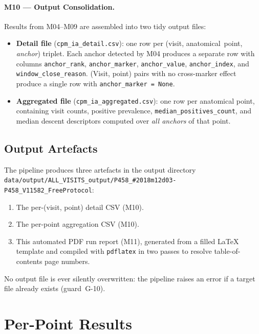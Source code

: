 \documentclass[a4paper,11pt]{article}
\begin{document}
\paragraph{M10 --- Output Consolidation.}
Results from M04--M09 are assembled into two tidy output files:
\begin{itemize}
  \item \textbf{Detail file} (\texttt{cpm\_ia\_detail.csv}): one row per
        (visit, anatomical~point, \emph{anchor}) triplet. Each anchor detected by M04
        produces a separate row with columns \texttt{anchor\_rank},
        \texttt{anchor\_marker}, \texttt{anchor\_value}, \texttt{anchor\_index},
        and \texttt{window\_close\_reason}.
        (Visit, point) pairs with no cross-marker effect produce a single row with
        \texttt{anchor\_marker = None}.
  \item \textbf{Aggregated file} (\texttt{cpm\_ia\_aggregated.csv}): one row per
        anatomical point, containing visit counts, positive prevalence,
        \texttt{median\_positives\_count}, and median descent descriptors computed over
        \emph{all anchors} of that point.
\end{itemize}

\subsection{Output Artefacts}

The pipeline produces three artefacts in the output directory \texttt{data/output/ALL\_VISITS\_output/P458\_\#2018m12d03-P458\_V11582\_FreeProtocol}:
\begin{enumerate}
  \item The per-(visit, point) detail CSV (M10).
  \item The per-point aggregation CSV (M10).
  \item This automated PDF run report (M11), generated from a filled \LaTeX{} template
        and compiled with \texttt{pdflatex} in two passes to resolve table-of-contents
        page numbers.
\end{enumerate}
No output file is ever silently overwritten: the pipeline raises an error if a target
file already exists (guard~G-10).

\section{Per-Point Results}
\end{document}
